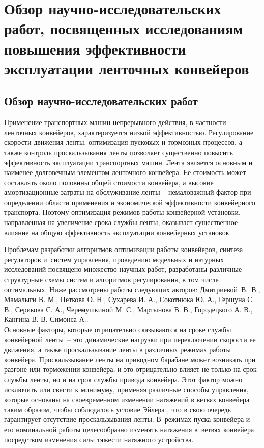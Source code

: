
\chapter{Обзор научно-исследовательских работ, посвященных исследованиям повышения эффективности эксплуатации ленточных конвейеров} \label{chapt1}

\section{Обзор научно-исследовательских работ} \label{sect1_1}

Применение транспортных машин непрерывного действия, в частности ленточных конвейеров, характеризуется низкой эффективностью. Регулирование скорости движения ленты, оптимизация пусковых и тормозных процессов, а также контроль проскальзывания ленты позволяет существенно повысить эффективность эксплуатации транспортных машин. Лента является основным и наименее долговечным элементом ленточного конвейера. Ее стоимость может составлять около половины общей стоимости конвейера, а высокие амортизационные затраты на обслуживание ленты -- немаловажный фактор при определении области применения и экономической эффективности конвейерного транспорта. Поэтому оптимизация режимов работы конвейерной установки, направленная на увеличение срока службы ленты, оказывает существенное влияние на общую эффективность эксплуатации конвейерных установок.  

Проблемам разработки алгоритмов оптимизации работы конвейеров, синтеза регуляторов и~систем управления, проведению модельных и натурных исследований посвящено множество научных работ, разработаны различные структурные схемы систем и алгоритмов регулирования, в том числе оптимальных. Ниже рассмотрены работы следующих авторов: Дмитриевой~В.~В., Мамалыги В. М., Петкова О. Н., Сухарева И. А., Сокотнюка Ю. А., Гершуна С. В., Серикова С. А., Черемушкиной М. С., Мартынова В. В., Городецкого А. В., Кангина В. В. Симонса А..\\

Основные факторы, которые отрицательно сказываются на сроке службы конвейерной ленты~-- это динамические нагрузки при переключении скорости ее движения, а также проскальзывание ленты в различных режимах работы конвейера. Проскальзывание ленты на приводном барабане может возникать при разгоне или торможении конвейера, и это отрицательно влияет не только на срок службы ленты, но и на срок службы привода конвейера. Этот фактор можно исключить или свести к минимуму, применяя различные способы управления, которые основаны на своевременном изменении натяжений в ветвях конвейера таким образом, чтобы соблюдалось условие Эйлера \cite{vdmitriev}, что в свою очередь гарантирует отсутствие проскальзывания ленты. В~режимах пуска конвейера и его номинальной работы целесообразно изменять натяжения в~ветвях конвейера посредством изменения силы тяжести натяжного устройства.\\

